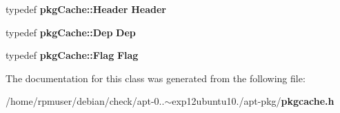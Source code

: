 \begin{DoxyCompactItemize}
\item 
typedef {\bf pkg\-Cache\-::\-Header} {\bfseries \-Header}\label{classpkgCache_1_1Namespace_a293d4384c0d1c9ee01c7d38d53f039ff}

\item 
typedef {\bf pkg\-Cache\-::\-Dep} {\bfseries \-Dep}\label{classpkgCache_1_1Namespace_a20e7224d7d01eb91ed0e976a8a7fadd8}

\item 
typedef {\bf pkg\-Cache\-::\-Flag} {\bfseries \-Flag}\label{classpkgCache_1_1Namespace_a420dd7f197a332128fe46458833d915a}

\end{DoxyCompactItemize}


\-The documentation for this class was generated from the following file\-:\begin{DoxyCompactItemize}
\item 
/home/rpmuser/debian/check/apt-\/0..$\sim$exp12ubuntu10./apt-\/pkg/{\bf pkgcache.\-h}\end{DoxyCompactItemize}
